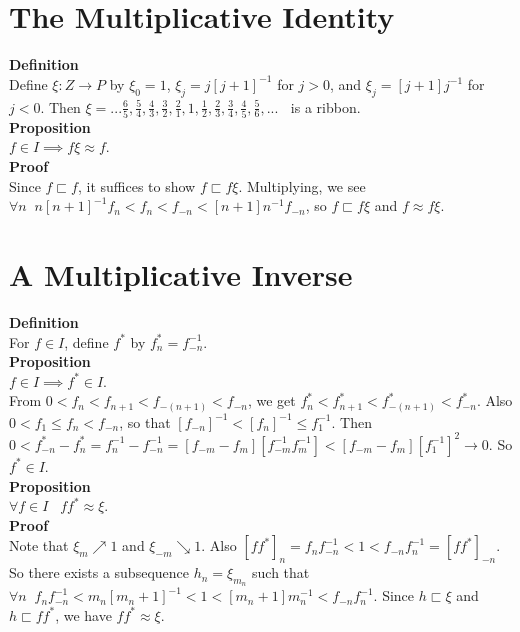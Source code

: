 \documentclass{article}
\newcommand{\rat}{ P }
\newcommand{\zee}{ Z }
\newcommand{\zeqs}{ I}
\newcommand{\forks}{ \sqsubset}
\newcommand{\ident}{ \xi}
\begin{document}
\section{The Multiplicative Identity}

\textbf{Definition}\\
Define $\ident : \zee \to \rat$ by $\ident_0 = 1$, $\ident_j = j[j+1]^{-1}$ for $j > 0$, and $\ident_j = [j+1]j^{-1}$ for $j < 0$. Then  $\ident = ...\frac{6}{5},\frac{5}{4},\frac{4}{3},\frac{3}{2},\frac{2}{1},1,\frac{1}{2},\frac{2}{3},\frac{3}{4},\frac{4}{5},\frac{5}{6},... \;\;$ is a ribbon.\\


\textbf{Proposition}\\
$f \in \zeqs \implies f\ident \approx f$.\\

\textbf{Proof}\\
Since $f \forks f$, it suffices to show $f \forks f\ident$. Multiplying, we see $\forall n \;\; n[n+1]^{-1}f_n < f_n < f_{-n} < [n+1]n^{-1}f_{-n}$, so $f \forks f\ident$ and $f \approx f\ident.$\\


\section{A Multiplicative Inverse}

\textbf{Definition}\\
For $f \in \zeqs$, define $f^*$ by $f^*_{n} =  f^{-1}_{-n}$.\\

\textbf{Proposition}\\
$f \in \zeqs \implies f^* \in \zeqs$.\\


From $0 < f_n < f_{n+1} < f_{-(n+1)} < f_{-n}$, we get $f_{n}^* < f_{n+1}^* <  f_{-(n+1)}^* < f_{-n}^* $. Also $0 < f_1 \le f_n < f_{-n}$, so that $[f_{-n}]^{-1} <  [f_n]^{-1} \le f_1^{-1}$. Then $0 < f_{-n}^* - f_n^* = f_n^{-1} - f_{-n}^{-1} = [f_{-m} - f_{m}][f_{-m}^{-1}f_{m}^{-1}] < [f_{-m} - f_{m}][f_{1}^{-1}]^2 \to 0$. So $f^* \in \zeqs$.\\

\textbf{Proposition}\\
$\forall f \in \zeqs \;\;\; ff^* \approx \ident$.\\

\textbf{Proof}\\
Note that $\ident_m \nearrow 1$ and $\ident_{-m} \searrow 1$. Also $[ff^*]_{n} = f_{n}f_{-n}^{-1} < 1 < f_{-n}f_n^{-1} = [ff^*]_{-n}$. So there exists a subsequence $h_n = \ident_{m_n}$ such that $\forall n \;\;f_{n}f_{-n}^{-1} < m_n[m_n+1]^{-1} < 1 < [m_n+1]m_n^{-1} < f_{-n}f_n^{-1}$. Since $h \forks \ident$ and $h \forks ff^*$, we have $ff^* \approx \ident$.\\
\end{document}
